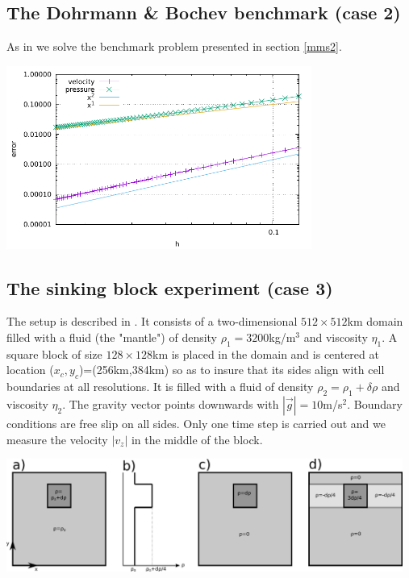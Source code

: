 \subsection*{The Dohrmann \& Bochev benchmark (case 2)} 

As in \cite{dobo04} we solve the benchmark problem presented in section \ref{mms2}.

\begin{center}
\includegraphics[width=10cm]{python_codes/fieldstone_22/results/case2/errors.pdf}
\end{center}



\subsection*{The sinking block experiment (case 3)} 

The setup is described in \cite{thba19}. 
It consists of a two-dimensional $512\times 512$km domain filled with a fluid (the "mantle") 
of density $\rho_1=3200$kg/m$^3$ and viscosity $\eta_1$. A square block of 
size $128\times 128$km is placed in the domain and is centered at location 
($x_c,y_c$)=(256km,384km) so as to insure that its sides align with cell boundaries at 
all resolutions. It is filled with a fluid of density $\rho_2=\rho_1+\delta \rho$ 
and viscosity $\eta_2$. The gravity vector points downwards with $|\vec{g}|=10$m/s$^2$. 
Boundary conditions are free slip on all sides. Only one time step is carried out and 
we measure the velocity $|v_z|$ in the middle of the block. 

\begin{center}
\includegraphics[width=13cm]{python_codes/fieldstone_22/results/case3/blocks}
\end{center}

